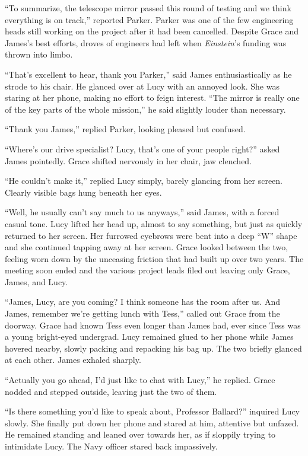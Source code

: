 \documentclass[openany, 12pt]{book} %
\begin{document}
``To summarize, the telescope mirror passed this round of testing and we think everything is on track,'' reported Parker. Parker was one of the few engineering heads still working on the project after it had been cancelled. Despite Grace and James's best efforts, droves of engineers had left when \textit{Einstein}'s funding was thrown into limbo.

``That's excellent to hear, thank you Parker,'' said James enthusiastically as he strode to his chair. He glanced over at Lucy with an annoyed look. She was staring at her phone, making no effort to feign interest. ``The mirror is really one of the key parts of the whole mission,'' he said slightly louder than necessary.

``Thank you James,'' replied Parker, looking pleased but confused.

``Where's our drive specialist? Lucy, that's one of your people right?'' asked James pointedly. Grace shifted nervously in her chair, jaw clenched.

``He couldn't make it,'' replied Lucy simply, barely glancing from her screen. Clearly visible bags hung beneath her eyes.

``Well, he usually can't say much to us anyways,'' said James, with a forced casual tone. Lucy lifted her head up, almost to say something, but just as quickly returned to her screen. Her furrowed eyebrows were bent into a deep ``W'' shape and she continued tapping away at her screen. Grace looked between the two, feeling worn down by the unceasing friction that had built up over two years. The meeting soon ended and the various project leads filed out leaving only Grace, James, and Lucy.

``James, Lucy, are you coming? I think someone has the room after us. And James, remember we're getting lunch with Tess,'' called out Grace from the doorway. Grace had known Tess even longer than James had, ever since Tess was a young bright-eyed undergrad. Lucy remained glued to her phone while James hovered nearby, slowly packing and repacking his bag up. The two briefly glanced at each other. James exhaled sharply.

``Actually you go ahead, I'd just like to chat with Lucy,'' he replied. Grace nodded and stepped outside, leaving just the two of them.

``Is there something you'd like to speak about, Professor Ballard?'' inquired Lucy slowly. She finally put down her phone and stared at him, attentive but unfazed. He remained standing and leaned over towards her, as if sloppily trying to intimidate Lucy. The Navy officer stared back impassively.
\end{document}
